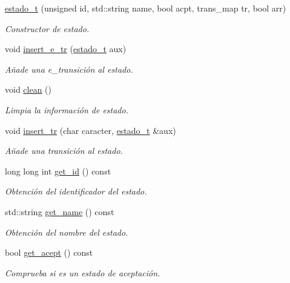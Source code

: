\begin{DoxyCompactItemize}
\hyperlink{classestado__t_a8376c7515ca760a9a654cd226af3e625}{estado\+\_\+t} (unsigned id, std\+::string name, bool acpt, trans\+\_\+map tr, bool arr)
\begin{DoxyCompactList}\small\item\em Constructor de estado. \end{DoxyCompactList}\item 
void \hyperlink{classestado__t_a96d95f170a07bf03280f4884329ab91c}{insert\+\_\+e\+\_\+tr} (\hyperlink{classestado__t}{estado\+\_\+t} aux)
\begin{DoxyCompactList}\small\item\em Añade una e\+\_\+transición al estado. \end{DoxyCompactList}\item 
\mbox{\label{classestado__t_a1d19472d62f11cf49d60f7d4fa45ec69}} 
void \hyperlink{classestado__t_a1d19472d62f11cf49d60f7d4fa45ec69}{clean} ()
\begin{DoxyCompactList}\small\item\em Limpia la información de estado. \end{DoxyCompactList}\item 
void \hyperlink{classestado__t_a42ac67d9addaed274e82253476d90e52}{insert\+\_\+tr} (char caracter, \hyperlink{classestado__t}{estado\+\_\+t} \&aux)
\begin{DoxyCompactList}\small\item\em Añade una transición al estado. \end{DoxyCompactList}\item 
long long int \hyperlink{classestado__t_a399434150ccd2b0f6b3515a39e8f66bc}{get\+\_\+id} () const
\begin{DoxyCompactList}\small\item\em Obtención del identificador del estado. \end{DoxyCompactList}\item 
std\+::string \hyperlink{classestado__t_ac64d1589868898d6c0d8429796ad6e43}{get\+\_\+name} () const
\begin{DoxyCompactList}\small\item\em Obtención del nombre del estado. \end{DoxyCompactList}\item 
bool \hyperlink{classestado__t_aa142e9b906009925b9aeeeb8712f59b8}{get\+\_\+acept} () const
\begin{DoxyCompactList}\small\item\em Comprueba si es un estado de aceptación. \end{DoxyCompactList}\item 

\end{DoxyCompactItemize}
